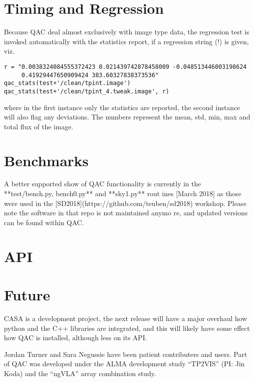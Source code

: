 \documentclass[11pt,twoside]{article}
\begin{document}
\section{Timing and Regression}

Because QAC deal almost exclusively with image type data, the regression test is invoked automatically
with the statistics report, if a regression string (!) is given, viz.

\footnotesize
\begin{verbatim}
r = "0.0038324084555372423 0.021439742878458009 -0.048513446003198624
     0.41929447650909424 383.60327838373536"
qac_stats(test+'/clean/tpint.image')
qac_stats(test+'/clean/tpint_4.tweak.image', r)
\end{verbatim}
\normalsize

where in the first instance only the statistics are reported, the second instance will also flag any deviations.
The numbers represent the mean, std, min, max and total flux of the image.

\section{Benchmarks}

A better supported show of QAC functionality is currently in the **test/bench.py, bench0.py** and **sky1.py** rout
ines [March 2018] as those were used in the
[SD2018](https://github.com/teuben/sd2018) workshop. Please note the software in that repo is not maintained anymo
re, and updated versions can be found
within QAC.

\section{API}




\section{Future}

CASA is a development project, the next
release will have a major overhaul how python and the C++ libraries
are integrated, and this will likely have some effect how QAC is
installed, although less on its API. 

\acknowledgements Jordan Turner and Sara Negussie have been patient contributers and users.
Part of QAC was developed under the ALMA development study ``TP2VIS''  (PI: Jin Koda) and
the ``ngVLA'' array combination study.


\end{document}
